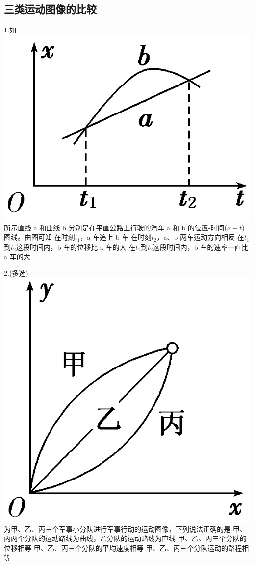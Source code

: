 \documentclass[a4paper,fontset = windows]{ctexbook} %
\begin{document}
\subsection{三类运动图像的比较}
\begin{xuanze}
   1.如
\includegraphics{../picture/1-3/001.png} 
所示直线 a 和曲线 b 分别是在平直公路上行驶的汽车 a 和 b 的位置-时间($x-t$)图线。由图可知
\choice[A] 在时刻$t_1$，a 车追上 b 车
\choice[B] 在时刻$t_2$，a、b 两车运动方向相反
\choice[C] 在$t_1$到$t_2$这段时间内，b 车的位移比 a 车的大
\choice[D] 在$t_1$到$t_2$这段时间内，b 车的速率一直比 a 车的大

2.(多选)
\includegraphics{../picture/1-3/002.png} 
为甲、乙、丙三个军事小分队进行军事行动的运动图像，下列说法正确的是
\choice[A] 甲、丙两个分队的运动路线为曲线，乙分队的运动路线为直线
\choice[B] 甲、乙、丙三个分队的位移相等
\choice[C] 甲、乙、丙三个分队的平均速度相等
\choice[D] 甲、乙、丙三个分队运动的路程相等


\end{xuanze}
\end{document}
